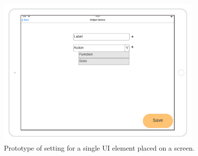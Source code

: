 \begin{figure}[H]
    \centering
    \begin{minipage}{0.45\textwidth}
        \centering
        \includegraphics[width=0.9\textwidth]{images/ui-element-settings-mockup.png}
        \caption{Prototype of setting for a single UI element placed on a screen.}
    \end{minipage}\hfill
    \begin{minipage}{0.45\textwidth}
    \end{minipage}
\end{figure}